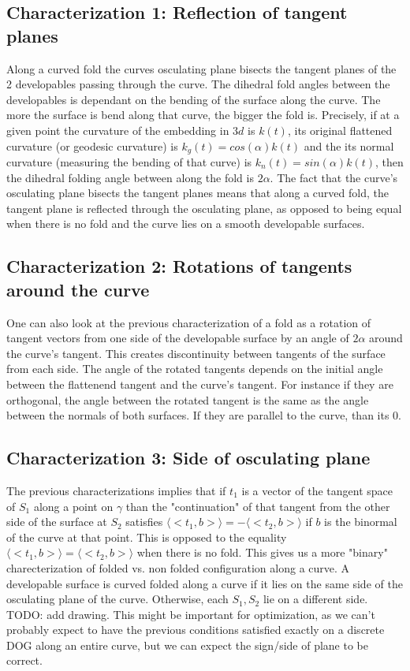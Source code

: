 \documentclass{article}
\theoremstyle{definition}
\begin{document}
\subsection{Characterization 1: Reflection of tangent planes}
Along a curved fold the curves osculating plane bisects the tangent planes of the 2 developables passing through the curve. The dihedral fold angles between the developables is dependant on the bending of the surface along the curve. The more the surface is bend along that curve, the bigger the fold is. Precisely, if at a given point the curvature of the embedding in $3d$ is $k(t)$, its original flattened curvature (or geodesic curvature) is $k_g(t) = cos(\alpha)k(t)$ and the its normal curvature (measuring the bending of that curve) is $k_n(t) = sin(\alpha)k(t)$, then the dihedral folding angle between along the fold is $2\alpha$. The fact that the curve's osculating plane bisects the tangent planes means that along a curved fold, the tangent plane is reflected through the osculating plane, as opposed to being equal when there is no fold and the curve lies on a smooth developable surfaces.

\subsection{Characterization 2: Rotations of tangents around the curve}
One can also look at the previous characterization of a fold as a rotation of tangent vectors from one side of the developable surface by an angle of $2\alpha$ around the curve's tangent. This creates discontinuity between tangents of the surface from each side. The angle of the rotated tangents depends on the initial angle between the flattenend tangent and the curve's tangent. For instance if they are orthogonal, the angle between the rotated tangent is the same as the angle between the normals of both surfaces. If they are parallel to the curve, than its 0.

\subsection{Characterization 3: Side of osculating plane}
The previous characterizations implies that if $t_1$ is a vector of the tangent space of $S_1$ along a point on $\gamma$ than the "continuation" of that tangent from the other side of the surface at $S_2$ satisfies $\langle <t_1,b> \rangle = -\langle <t_2,b> \rangle$ if $b$ is the binormal of the curve at that point. This is opposed to the equality $\langle <t_1,b> \rangle = \langle <t_2,b> \rangle$ when there is no fold. This gives us a more "binary" charecterization of folded vs. non folded configuration along a curve. A developable surface is curved folded along a curve if it lies on the same side of the osculating plane of the curve. Otherwise, each $S_1,S_2$ lie on a different side. TODO: add drawing.
This might be important for optimization, as we can't probably expect to have the previous conditions satisfied exactly on a discrete DOG along an entire curve, but we can expect the sign/side of plane to be correct.
\end{document}
